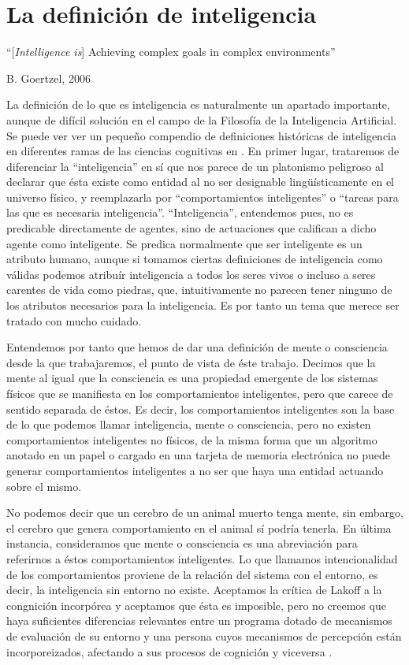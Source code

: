 \documentclass[12pt]{memoir}
\begin{document}
\chapter{La definición de inteligencia}

\epigraph{``[\textit{Intelligence is}] Achieving complex goals in complex environments''}{B. Goertzel, 2006}

La definición de lo que es inteligencia es naturalmente un apartado importante, aunque de difícil solución en el campo de la Filosofía de la Inteligencia Artificial. Se puede ver ver un pequeño compendio de definiciones históricas de inteligencia en diferentes ramas de las ciencias cognitivas en \cite{intDefs}. En primer lugar, trataremos de diferenciar la ``inteligencia'' en sí que nos parece de un platonismo peligroso al declarar que ésta existe como entidad al no ser designable lingüísticamente en el universo físico, y reemplazarla por ``comportamientos inteligentes'' o ``tareas para las que es necesaria inteligencia''. ``Inteligencia'', entendemos pues, no es predicable directamente de agentes, sino de actuaciones que califican a dicho agente como inteligente. Se predica normalmente que ser inteligente es un atributo humano, aunque si tomamos ciertas definiciones de inteligencia como válidas podemos atribuír inteligencia a todos los seres vivos o incluso a seres carentes de vida como piedras, que, intuitivamente no parecen tener ninguno de los atributos necesarios para la inteligencia. Es por tanto un tema que merece ser tratado con mucho cuidado.

Entendemos por tanto que hemos de dar una definición de mente o consciencia desde la que trabajaremos, el punto de vista de éste trabajo. Decimos que la mente al igual que la consciencia es una propiedad emergente de los sistemas físicos que se manifiesta en los comportamientos inteligentes, pero que carece de sentido separada de éstos. Es decir, los comportamientos inteligentes son la base de lo que podemos llamar inteligencia, mente o consciencia, pero no existen comportamientos inteligentes no físicos, de la misma forma que un algoritmo anotado en un papel o cargado en una tarjeta de memoria electrónica no puede generar comportamientos inteligentes a no ser que haya una entidad actuando sobre el mismo. 

No podemos decir que un cerebro de un animal muerto tenga mente, sin embargo, el cerebro que genera comportamiento en el animal sí podría tenerla. En última instancia, consideramos que mente o consciencia es una abreviación para referirnos a éstos comportamientos inteligentes. Lo que llamamos intencionalidad de los comportamientos proviene de la relación del sistema con el entorno, es decir, la inteligencia sin entorno no existe. Aceptamos la crítica de Lakoff a la congnición incorpórea y aceptamos que ésta es imposible, pero no creemos que haya suficientes diferencias relevantes entre un programa dotado de mecanismos de evaluación de su entorno y una persona cuyos mecanismos de percepción están incorporeizados, afectando a sus procesos de cognición y viceversa \parencite{lakoff}. 
\end{document}
